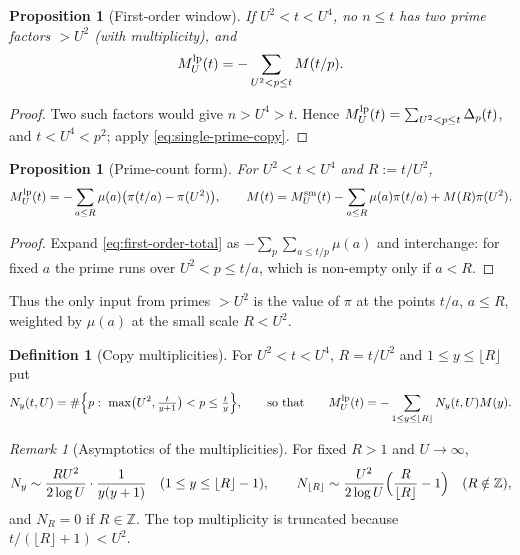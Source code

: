 \documentclass[11pt]{amsart}
\numberwithin{equation}{section}
\theoremstyle{plain}
\newtheorem{proposition}[theorem]{Proposition}
\theoremstyle{definition}
\newtheorem{definition}[theorem]{Definition}
\theoremstyle{remark}
\newtheorem{remark}[theorem]{Remark}
\begin{document}
\begin{proposition}[First-order window]
\label{prop:linear-new-primes}
If $U^2<t<U^4$, no $n\le t$ has two prime factors $>U^2$ (with
multiplicity), and
\begin{equation}
\label{eq:first-order-total}
  M^{\rm lp}_U(t)=-\sum_{U^2<p\le t}M(t/p).
\end{equation}
\end{proposition}

\begin{proof}
Two such factors would give $n>U^4>t$. Hence $M^{\rm lp}_U(t)=\sum_{U^2<p\le t}
\Delta_p(t)$, and $t<U^4<p^2$; apply \eqref{eq:single-prime-copy}.
\end{proof}

\begin{proposition}[Prime-count form]
\label{prop:prime_count_form}
For $U^2<t<U^4$ and $R:=t/U^2$,
\begin{equation}
\label{eq:prime_count_form}
  M^{\rm lp}_U(t)=-\sum_{a\le R}\mu(a)\bigl(\pi(t/a)-\pi(U^2)\bigr),
  \qquad
  M(t)=M^{\rm sm}_U(t)-\sum_{a\le R}\mu(a)\pi(t/a)+M(R)\pi(U^2).
\end{equation}
\end{proposition}

\begin{proof}
Expand \eqref{eq:first-order-total} as $-\sum_{p}\sum_{a\le t/p}\mu(a)$ and
interchange: for fixed $a$ the prime runs over $U^2<p\le t/a$, which is
non-empty only if $a<R$.
\end{proof}

Thus the only input from primes $>U^2$ is the value of $\pi$ at the points
$t/a$, $a\le R$, weighted by $\mu(a)$ at the small scale $R<U^2$.

\begin{definition}[Copy multiplicities]
\label{def:copy-multiplicity}
For $U^2<t<U^4$, $R=t/U^2$ and $1\le y\le\lfloor R\rfloor$ put
\begin{equation}
\label{eq:Ny-exact}
  N_y(t,U)=\#\Bigl\{p:\ \max\bigl(U^2,\tfrac{t}{y+1}\bigr)<p\le\tfrac ty\Bigr\},
  \qquad\text{so that}\qquad
  M^{\rm lp}_U(t)=-\sum_{1\le y\le\lfloor R\rfloor}N_y(t,U)M(y).
\end{equation}
\end{definition}

\begin{remark}[Asymptotics of the multiplicities]
\label{rem:copy-count-asymptotic}
For fixed $R>1$ and $U\to\infty$,
\begin{equation}
\label{eq:Ny-fixed-R}
  N_y\sim\frac{RU^2}{2\log U}\cdot\frac1{y(y+1)}\quad(1\le y\le\lfloor R\rfloor-1),
  \qquad
  N_{\lfloor R\rfloor}\sim\frac{U^2}{2\log U}\Bigl(\frac R{\lfloor R\rfloor}-1\Bigr)
  \quad(R\notin\mathbb{Z}),
\end{equation}
and $N_R=0$ if $R\in\mathbb{Z}$. The top multiplicity is truncated because
$t/(\lfloor R\rfloor+1)<U^2$.
\end{remark}
\end{document}
